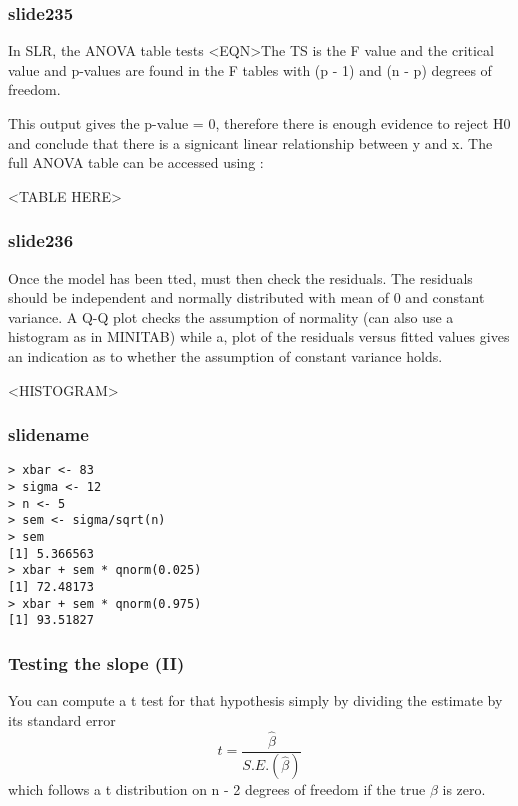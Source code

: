 \documentclass[a4paper,12pt]{article}
\begin{document}
\begin{itemize}

\subsubsection{slide235}

In SLR, the ANOVA table tests <EQN>The TS is the F value and the critical value and p-values are found
in the F tables with (p - 1) and (n - p) degrees of freedom.

This output gives the p-value = 0, therefore there is enough evidence to reject H0 and conclude that there is a signicant linear relationship between y and x. The full ANOVA table can be accessed using :

<TABLE HERE>



\subsubsection{slide236}
Once the model has been tted, must then check the residuals.
The residuals should be independent and normally distributed with
mean of 0 and constant variance.
A Q-Q plot checks the assumption of normality (can also use a
histogram as in MINITAB) while a, plot of the residuals versus fitted values gives an indication as to whether the assumption of constant variance holds.

<HISTOGRAM>


\subsubsection{slidename}

\footnotesize \begin{verbatim}
> xbar <- 83
> sigma <- 12
> n <- 5
> sem <- sigma/sqrt(n)
> sem
[1] 5.366563
> xbar + sem * qnorm(0.025)
[1] 72.48173
> xbar + sem * qnorm(0.975)
[1] 93.51827
 \end{verbatim}\normalsize


\subsubsection{Testing the slope (II)}

You can compute a
t test for that hypothesis simply by dividing the estimate by its standard
error
\begin{equation}
t = \frac{\hat{\beta}}{S.E.(\hat{\beta})}
\end{equation}
which follows a t distribution on n - 2 degrees of freedom if the true $\beta$ is
zero.



\end{itemize}
\end{document}
